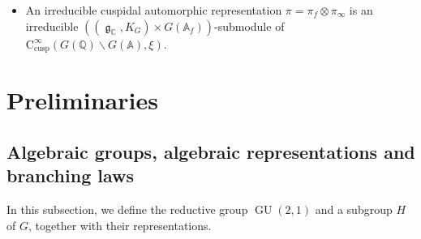 \documentclass[11pt, a4paper]{amsart}
\theoremstyle{plain}
\theoremstyle{definition}
\numberwithin{equation}{section}
\def\AAA{\mathbb{A}}
\def\CC{\mathbb{C}}
\def\QQ{\mathbb{Q}}
\DeclareMathOperator{\GU}{GU}
\DeclareMathOperator{\lieg}{\mathfrak g}
\begin{document}
\begin{itemize}
    Smooth truncation to a large compact set modulo $A_{G}$ induces a map of $((\lieg_{\CC}, K_{G}) \times G(\AAA_f))$-modules 
    \begin{equation*}
        \mathrm{C}_{\mathrm{cusp}}^{\infty}(G(\QQ) \backslash G(\AAA), \xi) \rightarrow \mathrm{C}_{c}^{\infty}(G(\QQ) \backslash G(\AAA), \xi). 
    \end{equation*}
    \item An irreducible cuspidal automorphic representation $\pi = \pi_{f} \otimes \pi_{\infty}$ is an irreducible $((\lieg_{\CC}, K_{G}) \times G(\AAA_f))$-submodule of $\mathrm{C}_{\mathrm{cusp}}^{\infty}(G(\QQ) \backslash G(\AAA), \xi)$. 
\end{itemize}


\section{Preliminaries}
\label{Sec:preliminaries}

\subsection{Algebraic groups, algebraic representations and branching laws} 
\label{SS:algebraic groups}
In this subsection, we define the reductive group $\GU(2,1)$ and a subgroup $H$ of $G$, together with their representations. 
\end{document}
